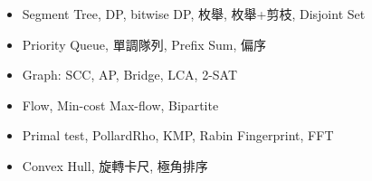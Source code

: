 \begin{itemize}
	\setlength\itemsep{-0.5em}
	\item Segment Tree, DP, bitwise DP, 枚舉, 枚舉+剪枝, Disjoint Set
	\item Priority Queue, 單調隊列, Prefix Sum, 偏序
	\item Graph: SCC, AP, Bridge, LCA, 2-SAT
	\item Flow, Min-cost Max-flow, Bipartite
	\item Primal test, PollardRho, KMP, Rabin Fingerprint, FFT
	\item Convex Hull, 旋轉卡尺, 極角排序
\end{itemize}
